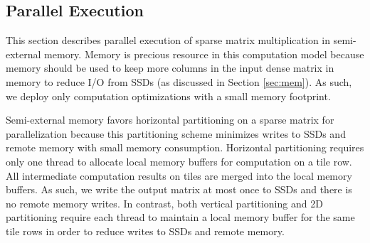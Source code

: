 
\subsection{Parallel Execution} \label{sec:exec}
This section describes parallel execution of sparse matrix multiplication
in semi-external memory. Memory is precious resource in this computation model
because memory should be used to keep more columns in the input dense matrix
in memory to reduce I/O from SSDs (as discussed in Section \ref{sec:mem}).
As such, we deploy only computation optimizations with a small memory footprint.

Semi-external memory favors horizontal partitioning on a sparse matrix
for parallelization because this partitioning scheme minimizes writes to SSDs
and remote memory with small memory consumption. Horizontal partitioning
requires only one thread to allocate local memory buffers for computation on
a tile row. All intermediate computation results on tiles are merged into
the local memory buffers. As such, we write the output matrix at most once
to SSDs and there is no remote memory writes.
In contrast, both vertical partitioning and 2D partitioning require each
thread to maintain a local memory buffer for the same tile rows in order
to reduce writes to SSDs and remote memory.

